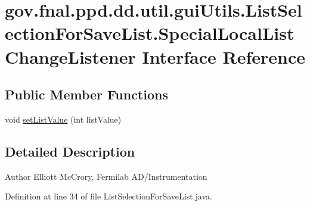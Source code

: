 \hypertarget{interfacegov_1_1fnal_1_1ppd_1_1dd_1_1util_1_1guiUtils_1_1ListSelectionForSaveList_1_1SpecialLocalListChangeListener}{\section{gov.\-fnal.\-ppd.\-dd.\-util.\-gui\-Utils.\-List\-Selection\-For\-Save\-List.\-Special\-Local\-List\-Change\-Listener Interface Reference}
\label{interfacegov_1_1fnal_1_1ppd_1_1dd_1_1util_1_1guiUtils_1_1ListSelectionForSaveList_1_1SpecialLocalListChangeListener}
}
\subsection*{Public Member Functions}
\begin{DoxyCompactItemize}
\item 
void \hyperlink{interfacegov_1_1fnal_1_1ppd_1_1dd_1_1util_1_1guiUtils_1_1ListSelectionForSaveList_1_1SpecialLocalListChangeListener_a94ad3a65d2ec7599e939ff272c126465}{set\-List\-Value} (int list\-Value)
\end{DoxyCompactItemize}


\subsection{Detailed Description}
\begin{DoxyAuthor}{Author}
Elliott Mc\-Crory, Fermilab A\-D/\-Instrumentation 
\end{DoxyAuthor}


Definition at line 34 of file List\-Selection\-For\-Save\-List.\-java.



